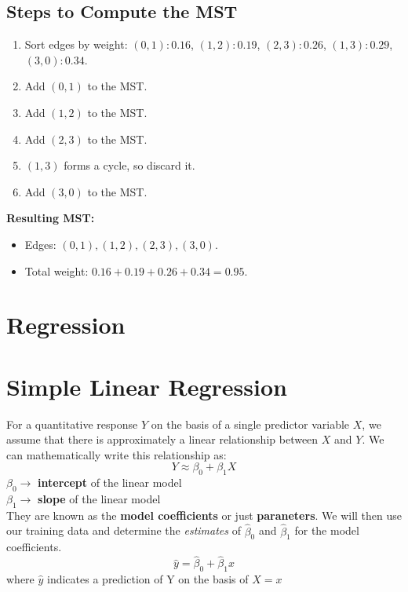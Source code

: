 \documentclass{article}
\begin{document}
\subsection*{Steps to Compute the MST}

\begin{enumerate}
    \item Sort edges by weight: \( (0,1): 0.16 \), \( (1,2): 0.19 \), \( (2,3): 0.26 \), \( (1,3): 0.29 \), \( (3,0): 0.34 \).
    \item Add \( (0,1) \) to the MST.
    \item Add \( (1,2) \) to the MST.
    \item Add \( (2,3) \) to the MST.
    \item \( (1,3) \) forms a cycle, so discard it.
    \item Add \( (3,0) \) to the MST.
\end{enumerate}

\textbf{Resulting MST:}
\begin{itemize}
    \item Edges: \( (0,1), (1,2), (2,3), (3,0) \).
    \item Total weight: \( 0.16 + 0.19 + 0.26 + 0.34 = 0.95 \).
\end{itemize}

\section{Regression}
\section*{Simple Linear Regression}
For a quantitative response $Y$ on the basis of a single predictor variable $X$, we assume that there is approximately a linear relationship between $X$ and $Y$. We can mathematically write this relationship as:
\begin{equation*} Y \approx \beta_0 + \beta_1 X \end{equation*} 
\hspace*{55mm} $\beta_0 \rightarrow$ \textbf{intercept} of the linear model \\
\hspace*{55mm} $\beta_1 \rightarrow$ \textbf{slope} of the linear model \\[6pt]
They are known as the \textbf{model coefficients} or just \textbf{paraneters}. We will then use our training data and determine the \textit{estimates} of $\hat{\beta}_0$ and $\hat{\beta}_1$ for the model coefficients. 
\begin{equation*} \tag{estimates} \hat{y} = \hat{\beta}_0 + \hat{\beta}_1 x \end{equation*} 
where $\hat{y}$ indicates a prediction of Y on the basis of $X=x$
\end{document}
